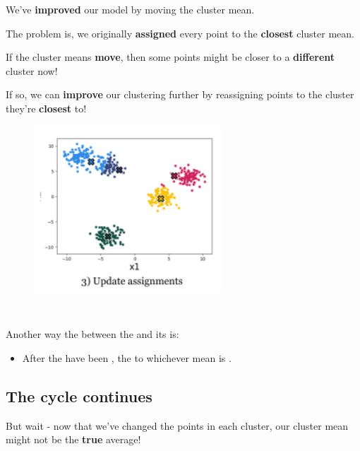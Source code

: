         We've \textbf{improved} our model by moving the cluster mean.
        
        The problem is, we originally \textbf{assigned} every point to the \textbf{closest} cluster mean. 
        
        If the cluster means \textbf{move}, then some points might be closer to a \textbf{different} cluster now!
        
        If so, we can \textbf{improve} our clustering further by reassigning points to the cluster they're \textbf{closest} to!
        
        \begin{figure}[H]
            \centering
            \includegraphics[width=70mm,scale=0.4]{images/clustering_images/update_assignments_clustering.png}
        \end{figure}\\
        
        \begin{concept}
            Another way  the  between the  and its  is:
            
            \begin{itemize}
                \item After the  have been ,  the  to whichever mean is .
            \end{itemize} 
        \end{concept}
        
    \subsection*{The cycle continues}
    
        But wait - now that we've changed the points in each cluster, our cluster mean might not be the \textbf{true} average!
        
